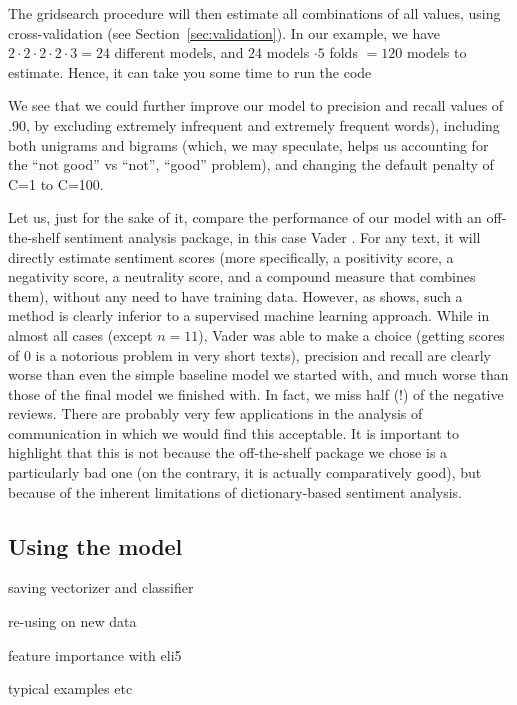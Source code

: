The gridsearch procedure will then estimate all combinations of all
values, using cross-validation (see Section~\ref{sec:validation}). In
our example, we have $2 \cdot 2 \cdot 2 \cdot 2 \cdot 3 = 24$
different models, and $24$ models $\cdot 5$ folds $= 120$ models to
estimate. Hence, it can take you some time to run the code

We see that we could further improve our model to precision and recall
values of .90, by excluding extremely infrequent and extremely
frequent words), including both unigrams and bigrams (which, we may
speculate, helps us accounting for the ``not good'' vs ``not'',
``good'' problem), and changing the default penalty of C=1 to C=100.

Let us, just for the sake of it, compare the performance of our model
with an off-the-shelf sentiment analysis package, in this case Vader
\citep{Hutto2014}. For any text, it will directly estimate sentiment
scores (more specifically, a positivity score, a negativity score, a
neutrality score, and a compound measure that combines them), without
any need to have training data. However, as  shows, such
a method is clearly inferior to a supervised machine learning
approach. While in almost all cases (except $n=11$), Vader was able to
make a choice (getting scores of 0 is a notorious problem in very
short texts), precision and recall are clearly worse than even the
simple baseline model we started with, and much worse than those of
the final model we finished with. In fact, we miss half (!) of the
negative reviews. There are probably very few applications in the
analysis of communication in which we would find this acceptable.
It is important to highlight that this is not because the off-the-shelf
package we chose is a particularly bad one (on the contrary, it is
actually comparatively good), but because of the inherent limitations
of dictionary-based sentiment analysis.






\subsection{Using the model}

saving vectorizer and classifier

re-using on new data

feature importance with eli5

typical examples etc



